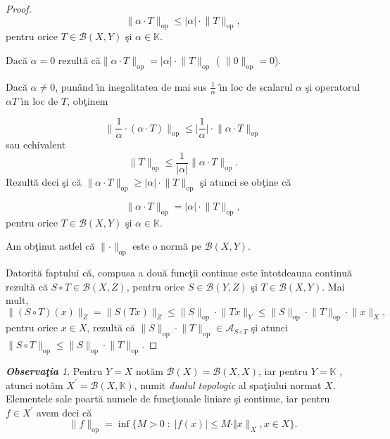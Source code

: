 \documentclass[ a4paper, 12pt]{report}
\theoremstyle{definition}
\theoremstyle{remark}
\newtheorem{obs}{\bf Observa\c tia }[section]
\numberwithin{equation}{section}
\begin{document}
\begin{proof}
$$\lVert \alpha \cdot T  \rVert_{\mbox{op}} \leq \lvert \alpha \rvert \cdot \lVert T \rVert_{\mbox{op}},$$ pentru orice $T \in \mathcal{B}(X,Y)$ \c si $\alpha \in \mathbb{K}$.

Dac\u a $\alpha = 0$ rezult\u a c\u a$\lVert  \alpha \cdot T \rVert_{\mbox{op}} = \lvert \alpha \rvert \cdot \lVert T \rVert_{\mbox{op}}$ ( $\lVert 0 \rVert_{\mbox{op}} = 0$).

Dac\u a $\alpha \neq 0$, pun\^ and \^\i n inegalitatea de mai sus $\frac{1}{\alpha}$ \^\i n loc de scalarul $\alpha$ \c si operatorul $\alpha T$ \^\i n loc de $T$, ob\c tinem

$$\lVert \frac{1}{\alpha} \cdot (\alpha \cdot T) \rVert_{\mbox{op}} \leq \lvert  \frac{1}{\alpha} \rvert \cdot \lVert \alpha \cdot T \rVert_{\mbox{op}}$$ sau echivalent
$$\lVert T \rVert_{\mbox{op}} \leq \frac{1}{\lvert \alpha \rvert} \lVert \alpha \cdot T \rVert_{\mbox{op}}.$$ Rezult\u a deci \c si c\u a
$\lVert \alpha \cdot T \rVert_{\mbox{op}} \geq \lvert \alpha \rvert \cdot \lVert T \rVert_{\mbox{op}}$ \c si atunci se ob\c tine c\u a

$$\lVert\! \alpha\! \cdot\! T \rVert_{\mbox{op}}\! =\! \lvert \alpha \rvert \cdot \lVert T \rVert_{\mbox{op}},$$ pentru orice $T\!\! \in\!\! \mathcal{B}(X,Y)$ \c si  $\alpha \in \mathbb{K}$.


Am ob\c tinut astfel c\u a $\lVert \cdot  \rVert_{\mbox{op}}$ este o norm\u a pe $\mathcal{B}(X,Y)$.

Datorit\u a faptului c\u a, compusa a dou\u a func\c tii continue este \^intotdeauna continu\u a rezult\u a c\u a $S \circ T \in \mathcal{B}(X,Z)$, pentru orice $S \in \mathcal{B}(Y,Z)$ \c si $T \in \mathcal{B}(X,Y)$.
Mai mult,
\[ \lVert (S \circ T)(x) \rVert_{Z} = \lVert S(Tx)  \rVert_{Z} \leq \lVert S \rVert_{\mbox{op}} \cdot \lVert Tx \rVert_{Y} \leq \lVert S \rVert_{\mbox{op}} \cdot \lVert T \rVert_{\mbox{op}} \cdot \lVert x \rVert_{X} ,\] pentru orice $x \in X$, rezult\u a c\u a $\lVert S \rVert_{\mbox{op}} \cdot \lVert T \rVert_{\mbox{op}} \in \mathcal{A}_{S \circ T}$ \c si atunci
 $\lVert S \circ T \rVert_{\mbox{op}} \leq \lVert S \rVert_{\mbox{op}} \cdot \lVert T \rVert_{\mbox{op}}.$

\end{proof}

\begin{obs}
Pentru $Y = X$ not\u am $\mathcal{B}(X) = \mathcal{B}(X,X)$, iar pentru $Y = \mathbb{K}$ , atunci not\u am $X^{'}= \mathcal{B}(X,\mathbb{K})$, numit {\it dualul topologic} al spa\c tiului normat $X$.
Elementele sale poart\u a numele de func\c tionale liniare \c si continue, iar pentru $f \in X^{'}$ avem deci c\u a
$$\lVert f \rVert_{\mbox{op}} = \inf \{ M >0 \; : \; \lvert f(x) \rvert \leq M \cdot \Vert x \rVert_{X},  x \in X\}.$$
 \end{obs}
\end{document}
